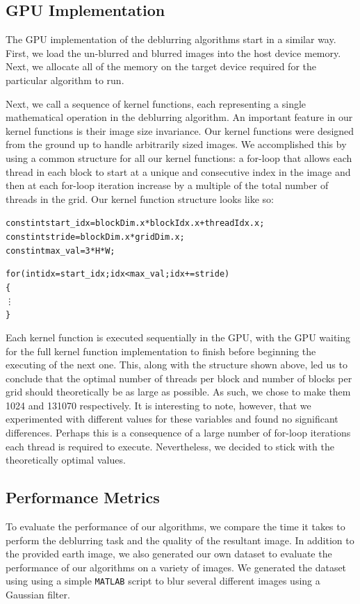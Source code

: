 \documentclass{article}
\begin{document}
  

\subsection{GPU Implementation}
The GPU implementation of the deblurring algorithms start in a similar way. First, we load the un-blurred and blurred images into the host device memory. Next, we allocate all of the memory on the target device required for the particular algorithm to run. 

Next, we call a sequence of kernel functions, each representing a single mathematical operation in the deblurring algorithm.
An important feature in our kernel functions is their image size invariance. Our kernel functions were designed from the ground up to handle arbitrarily sized images.
We accomplished this by using a common structure for all our kernel functions: a for-loop that allows each thread in each block to start at a unique and consecutive index in the image and then at each for-loop iteration increase by a multiple of the total number of threads in the grid. Our kernel function structure looks like so:
\begin{alltt}   
    const int start_idx = blockDim.x * blockIdx.x + threadIdx.x;
    const int stride    = blockDim.x * gridDim.x;
    const int max_val   = 3*H*W;
    
    for (int idx = start_idx; idx < max_val; idx += stride) 
    \{
        \vdots
    \}
\end{alltt}{}

Each kernel function is executed sequentially in the GPU, with the GPU waiting for the full kernel function implementation to finish before beginning the executing of the next one.
This, along with the structure shown above, led us to conclude that the optimal number of threads per block and number of blocks per grid should theoretically be as large as possible. As such, we chose to make them 1024 and 131070 respectively. It is interesting to note, however, that we experimented with different values for these variables and found no significant differences. Perhaps this is a consequence of a large number of for-loop iterations each thread is required to execute. Nevertheless, we decided to stick with the theoretically optimal values.


\subsection{Performance Metrics}
To evaluate the performance of our algorithms, we compare the time it takes to perform the deblurring task and the quality of the resultant image. In addition to the provided earth image, we also generated our own dataset to evaluate the performance of our algorithms on a variety of images. We generated the dataset using using a simple \texttt{MATLAB} script to blur several different images using a Gaussian filter. 
\end{document}
